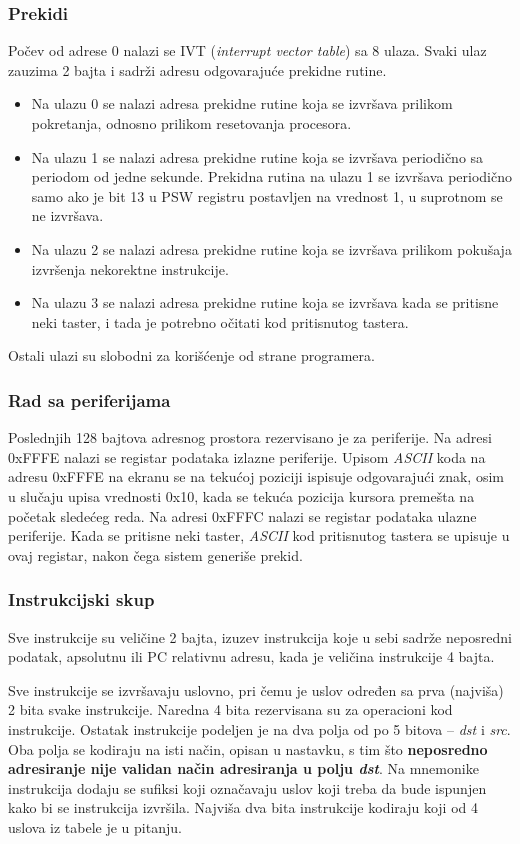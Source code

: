 \subsubsection{Prekidi}
Počev od adrese 0 nalazi se IVT (\textit{interrupt vector table}) sa 8 ulaza.
Svaki ulaz zauzima 2 bajta i sadrži adresu odgovarajuće prekidne rutine.
\begin{itemize}
    \item
    Na ulazu 0 se nalazi adresa prekidne rutine koja se izvršava prilikom
    pokretanja, odnosno prilikom resetovanja procesora.
    \item
    Na ulazu 1 se nalazi adresa prekidne
    rutine koja se izvršava periodično sa periodom od jedne sekunde. Prekidna
    rutina na ulazu 1 se izvršava periodično samo ako je bit 13 u PSW registru
    postavljen na vrednost 1, u suprotnom se ne izvršava.
    \item
    Na ulazu 2 se nalazi adresa prekidne rutine koja se izvršava prilikom
    pokušaja izvršenja nekorektne instrukcije.
    \item
    Na ulazu 3 se nalazi adresa prekidne rutine koja se izvršava kada se
    pritisne neki taster, i tada je potrebno očitati kod pritisnutog tastera.
\end{itemize}
Ostali ulazi su slobodni za korišćenje od strane
programera.

\subsubsection{Rad sa periferijama}
Poslednjih 128 bajtova adresnog prostora rezervisano je za periferije. Na
adresi 0xFFFE nalazi se registar podataka izlazne periferije. Upisom
\textit{ASCII} koda na adresu 0xFFFE na ekranu se na tekućoj poziciji
ispisuje odgovarajući znak, osim u slučaju upisa vrednosti 0x10, kada se
tekuća pozicija kursora premešta na početak sledećeg reda. Na adresi 0xFFFC
nalazi se registar podataka ulazne periferije. Kada se pritisne neki taster,
\textit{ASCII} kod pritisnut\-og tastera se upisuje u ovaj registar, nakon čega
sistem generiše prekid.

\subsubsection{Instrukcijski skup}
Sve instrukcije su veličine 2 bajta, izuzev instrukcija koje u sebi sadrže
neposredni podatak, apsolutnu ili PC relativnu adresu, kada je veličina
instr\-ukcije 4 bajta.

Sve instrukcije se izvršavaju uslovno, pri čemu je uslov
određen sa prva (najviša) 2 bita svake instrukcije. Naredna 4 bita rezervisana
su za operacioni kod instrukcije. Ostatak instrukcije podeljen je na dva polja
od po 5 bitova -- \textit{dst} i \textit{src}. Oba polja se kodiraju na isti
način, opisan u nastavku, s tim što \textbf{neposredno adresiranje nije
validan način adresiranja u polju \textit{dst}}.
Na mnemonike instrukcija dodaju se sufiksi koji označavaju uslov
koji treba da bude ispunjen kako bi se instrukcija izvršila. Najviša dva
bita instrukcije kodiraju koji od 4 uslova iz tabele je u pitanju.
\newpage %

